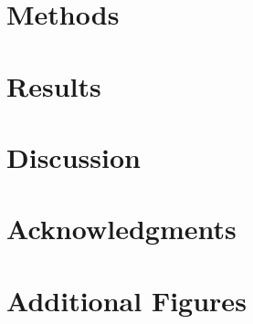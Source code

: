 \documentclass[aip,cha,reprint,superscriptaddress,floatfix,nofootinbib,twoside]{revtex4-1}
\begin{document}
\section{Methods}
\label{sec:methods}


\section{Results}
\label{sec:results}


\section{Discussion}
\label{sec:conclusion}




\appendix

\section{Acknowledgments}
\label{sec:acknowledgements}


\section{Additional Figures}
\label{sec:figures}

\end{document}
